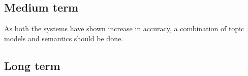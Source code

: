 \subsection{Medium term}
As both the systems have shown increase in accuracy, a combination of topic models and semantics should be done.

\subsection{Long term}

% 
